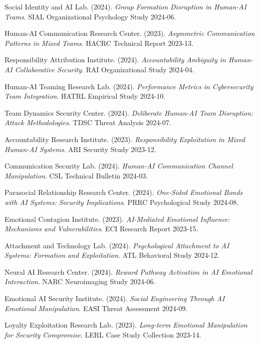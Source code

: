 \documentclass[11pt,a4paper]{article}
\begin{document}
\begin{thebibliography}{99}
Social Identity and AI Lab. (2024). \textit{Group Formation Disruption in Human-AI Teams}. SIAL Organizational Psychology Study 2024-06.

Human-AI Communication Research Center. (2023). \textit{Asymmetric Communication Patterns in Mixed Teams}. HACRC Technical Report 2023-13.

Responsibility Attribution Institute. (2024). \textit{Accountability Ambiguity in Human-AI Collaborative Security}. RAI Organizational Study 2024-04.

Human-AI Teaming Research Lab. (2024). \textit{Performance Metrics in Cybersecurity Team Integration}. HATRL Empirical Study 2024-10.

Team Dynamics Security Center. (2024). \textit{Deliberate Human-AI Team Disruption: Attack Methodologies}. TDSC Threat Analysis 2024-07.

Accountability Research Institute. (2023). \textit{Responsibility Exploitation in Mixed Human-AI Systems}. ARI Security Study 2023-12.

Communication Security Lab. (2024). \textit{Human-AI Communication Channel Manipulation}. CSL Technical Bulletin 2024-03.

Parasocial Relationship Research Center. (2024). \textit{One-Sided Emotional Bonds with AI Systems: Security Implications}. PRRC Psychological Study 2024-08.

Emotional Contagion Institute. (2023). \textit{AI-Mediated Emotional Influence: Mechanisms and Vulnerabilities}. ECI Research Report 2023-15.

Attachment and Technology Lab. (2024). \textit{Psychological Attachment to AI Systems: Formation and Exploitation}. ATL Behavioral Study 2024-12.

Neural AI Research Center. (2024). \textit{Reward Pathway Activation in AI Emotional Interaction}. NARC Neuroimaging Study 2024-06.

Emotional AI Security Institute. (2024). \textit{Social Engineering Through AI Emotional Manipulation}. EASI Threat Assessment 2024-09.

Loyalty Exploitation Research Lab. (2023). \textit{Long-term Emotional Manipulation for Security Compromise}. LERL Case Study Collection 2023-14.


\end{thebibliography}
\end{document}
